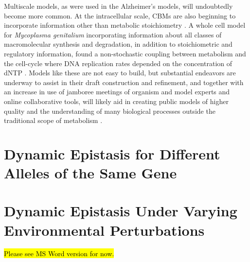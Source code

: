 \documentclass[phd,tocprelim]{cornell}
\newcommand*{\commonDir}{./common/}    %
\begin{document}
Multiscale models, as were used in the Alzheimer’s models, will
undoubtedly become more common. At the intracellular scale, CBMs are
also beginning to incorporate information other than metabolic
stoichiometry \citep{Lerman2012, Karr2012, Yizhak2010}. 
A whole cell model for \textit{Mycoplasma genitalium}
incorporating information about all classes of macromolecular
synthesis and degradation, in addition to stoichiometric and
regulatory information, found a non-stochastic coupling between
metabolism and the cell-cycle where DNA replication rates depended on
the concentration of dNTP \citep{Karr2012}. Models like these are not easy to build,
but substantial endeavors are underway to assist in their draft
construction and refinement, and together with an increase in use of
jamboree meetings of organism and model experts and online
collaborative tools, will likely aid in creating public models of
higher quality and the understanding of many biological processes
outside the traditional scope of metabolism \citep{Aziz2012,
Thiele2013, Herrgard2008, Karr2013, kbase2013, Pabinger2011,
Helikar2012}.


%

\chapter{Dynamic Epistasis for Different Alleles of the Same Gene}
\epiSameGeneAbstract


\chapter{Dynamic Epistasis Under Varying Environmental Perturbations}
\epistasisEnviroAbstract

\hl{Please see MS Word version for now.}
\end{document}
